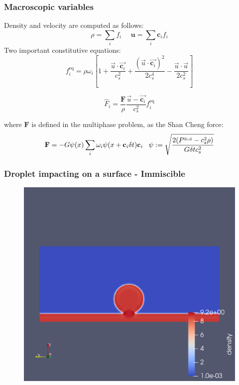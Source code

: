 \documentclass{beamer}
\begin{document}
		
		\begin{frame}
			\frametitle{Macroscopic variables}
			Density and velocity are computed as follows:
			\begin{equation}
				\rho = \sum_i f_i \, \, \, \, \, \, \, \,  \mathbf{u} = \sum_i \mathbf{c}_i f_i
			\end{equation}
			Two important constitutive equations:
			\begin{equation*}
				f_i^{\text{eq}} = \rho \omega_i \left[ 1 + \frac{\vec{u}\cdot \vec{\mathbf{c}_i}}{c^2_s} + \frac{(\vec{u}\cdot \vec{\mathbf{c}_i})^2}{2c^4_s}-  \frac{\vec{u}\cdot \vec{u}}{2c^2_s} \right]
			\end{equation*}
			
			\begin{equation*}
			\hat{F}_i = \frac{\mathbf{F}}{\rho} \frac{\vec{u} - \vec{\mathbf{c}_i}}{c^2_s} f_i^{\text{eq}}  
			\end{equation*}
			
			where $\mathbf{F}$ is defined in the multiphase problem, as the Shan Cheng force:
			\begin{equation}
				\mathbf{F} = -G \psi(x) \sum_i \omega_i \psi(x+\mathbf{c}_i \delta t) \mathbf{c}_i \, \, \, \, \, \psi := \sqrt{\frac{2(P^{\text{\tiny EoS}}-c_s^2\rho)}{G \delta t c_s^2}}
			\end{equation}
		\end{frame}
		\begin{frame}
			\frametitle{Droplet impacting on a surface - Immiscible}
			\begin{figure}
				\includegraphics[scale=0.4]{pics/impactingDroplet.pdf}
			\end{figure}
		\end{frame}
		
\end{document}
